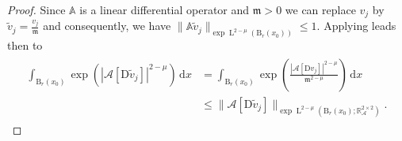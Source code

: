 \documentclass[a4paper,10pt,reqno,oneside]{amsart}
\numberwithin{equation}{section}
\newcommand{\R}{\mathbb R}
\newcommand{\ball}{\mathrm{B}}
\newcommand{\A}{\mathscr{A}}
\newcommand{\Aop}{\mathbb{A}}
\newcommand{\lebe}{\operatorname{L}}
\newcommand{\D}{\mathrm{D}}
\newcommand{\dx}[1]{\,\mathrm{d}#1}
\newcommand{\abs}[1]{\left\lvert#1\right\rvert}
\begin{document}
\begin{proof}


Since $\Aop$ is a linear differential operator and $\mathfrak{m}>0$ we can replace $v_j$ by $\tilde{v}_j=\frac{v_j}{\mathfrak{m}}$ and consequently, we have  $\|\Aop \tilde{v}_j\|_{\exp\lebe^{2-\mu}(\ball_{r}(x_0))}\leq 1$.  Applying \cite[Lemma 8.8]{BennetSharpley} leads then to 
\begin{align}\label{eq:IntegralBound_C_Elliptic}
	\begin{split}
	\int_{\ball_r(x_0)} \exp(\abs{\A [\D\tilde{v}_j]}^{2-\mu})\dx{x} &= \int_{\ball_r(x_0)} \exp\left(\frac{\abs{\A [\D v_j]}^{2-\mu}}{\mathfrak{m}^{2-\mu}}\right)\dx{x}\\
	&\leq \|\A[\D \tilde{v}_j]\|_{\exp\lebe^{2-\mu}(\ball_{r}(x_0);\R^{2\times 2}_\A)}. 
	\end{split}
\end{align}


\end{proof}
\end{document}

